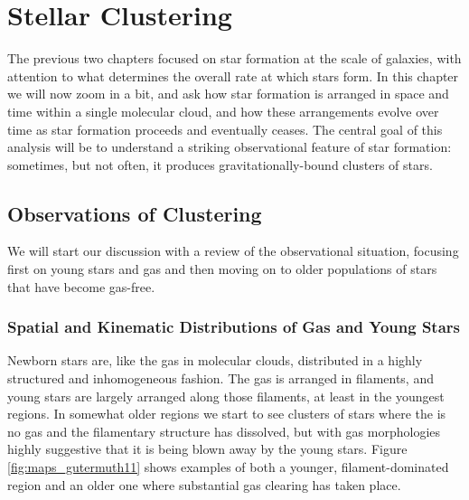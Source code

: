 \chapter{Stellar Clustering}
\label{ch:clustering}


The previous two chapters focused on star formation at the scale of galaxies, with attention to what determines the overall rate at which stars form. In this chapter we will now zoom in a bit, and ask how star formation is arranged in space and time within a single molecular cloud, and how these arrangements evolve over time as star formation proceeds and eventually ceases. The central goal of this analysis will be to understand a striking observational feature of star formation: sometimes, but not often, it produces gravitationally-bound clusters of stars.

\section{Observations of Clustering}

We will start our discussion with a review of the observational situation, focusing first on young stars and gas and then moving on to older populations of stars that have become gas-free.

\subsection{Spatial and Kinematic Distributions of Gas and Young Stars}

Newborn stars are, like the gas in molecular clouds, distributed in a highly structured and inhomogeneous fashion. The gas is arranged in filaments, and young stars are largely arranged along those filaments, at least in the youngest regions. In somewhat older regions we start to see clusters of stars where the is no gas and the filamentary structure has dissolved, but with gas morphologies highly suggestive that it is being blown away by the young stars. Figure \ref{fig:maps_gutermuth11} shows examples of both a younger, filament-dominated region and an older one where substantial gas clearing has taken place.

